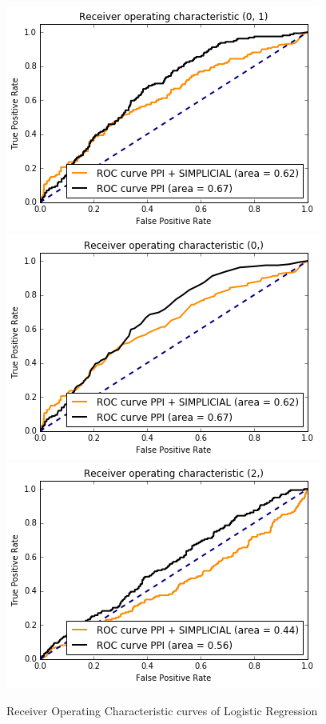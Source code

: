 \documentclass[9pt]{article}
\begin{document}
\begin{figure}[!htb]
  \includegraphics[width=\linewidth]{logisticRegressionGraphs/logr1S.png}
\endminipage\hfill
{}
  \includegraphics[width=\linewidth]{logisticRegressionGraphs/logr2S.png}
\endminipage\hfill
{}%
  \includegraphics[width=\linewidth]{logisticRegressionGraphs/logr3S.png}
\endminipage
\caption{Receiver Operating Characteristic curves of Logistic Regression}
\end{figure}
\end{document}
